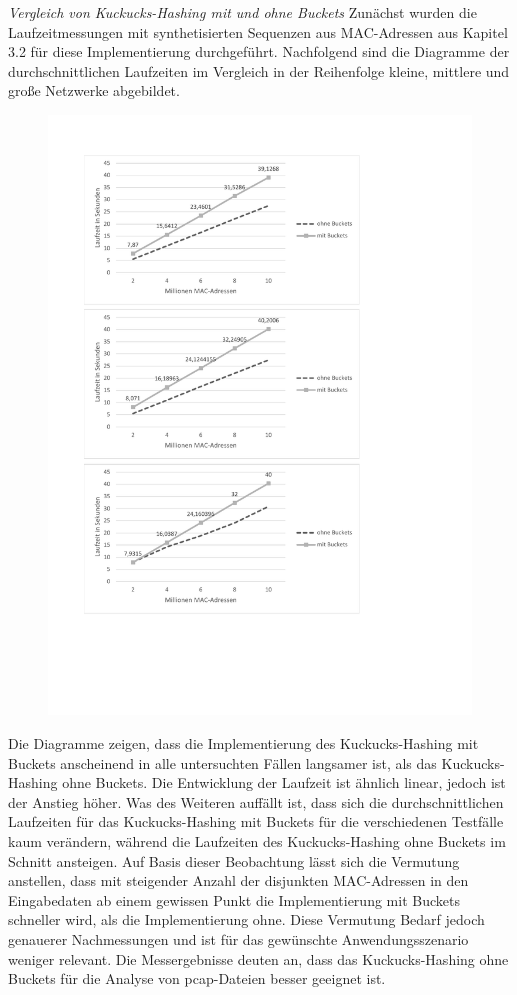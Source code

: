 \textit{Vergleich von Kuckucks-Hashing mit und ohne Buckets}
Zunächst wurden die Laufzeitmessungen mit synthetisierten Sequenzen aus MAC-Adressen aus Kapitel 3.2 für diese Implementierung durchgeführt. Nachfolgend sind die Diagramme der durchschnittlichen Laufzeiten im Vergleich in der Reihenfolge kleine, mittlere und große Netzwerke abgebildet.
\newpage\thispagestyle{empty}
\begin{figure}[H]
	\vspace*{-2.0cm}\hspace*{-1.7cm}\includegraphics[width=1.5\linewidth]{Bilder/vergleich_average.pdf}
\end{figure}
\newpage
Die Diagramme zeigen, dass die Implementierung des Kuckucks-Hashing mit Buckets anscheinend in alle untersuchten Fällen langsamer ist, als das Kuckucks-Hashing ohne Buckets. Die Entwicklung der Laufzeit ist ähnlich linear, jedoch ist der Anstieg höher. Was des Weiteren auffällt ist, dass sich die durchschnittlichen Laufzeiten für das Kuckucks-Hashing mit Buckets für die verschiedenen Testfälle kaum verändern, während die Laufzeiten des Kuckucks-Hashing ohne Buckets im Schnitt ansteigen. Auf Basis dieser Beobachtung lässt sich die Vermutung anstellen, dass mit steigender Anzahl der disjunkten MAC-Adressen in den Eingabedaten ab einem gewissen Punkt die Implementierung mit Buckets schneller wird, als die Implementierung ohne. Diese Vermutung Bedarf jedoch genauerer Nachmessungen und ist für das gewünschte Anwendungsszenario weniger relevant. Die Messergebnisse deuten an, dass das Kuckucks-Hashing ohne Buckets für die Analyse von pcap-Dateien besser geeignet ist.

